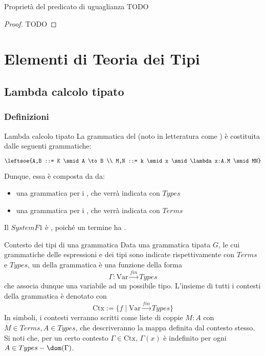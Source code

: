 \documentclass[a4paper, 12pt]{report}
\begin{document}
    \begin{framedprop}{Proprietà del predicato di uguaglianza}
        TODO
    \end{framedprop}

    \begin{proof}
        TODO
    \end{proof}

    \chapter{Elementi di Teoria dei Tipi}

    \section{Lambda calcolo tipato}

    \subsection{Definizioni}

    \begin{frameddefn}{Lambda calcolo tipato}
        La grammatica del  (noto in letteratura come ) è costituita dalle seguenti grammatiche:

        $$\leftsoe{A,B ::= K \smid A \to B \\ M,N ::= k \smid x \smid \lambda x:A.M \smid MN}$$

        Dunque, essa è composta da da:

        \begin{itemize}
            \item una grammatica per i , che verrà indicata con $Types$
            \item una grammatica per i , che verrà indicata con $Terms$
        \end{itemize}

        Il $System F1$ è , poiché un termine ha .
    \end{frameddefn}

    \begin{frameddefn}{Contesto dei tipi di una grammatica}
        Data una grammatica tipata $G$, le cui grammatiche delle espressioni e dei tipi sono indicate rispettivamente con $Terms$ e $Types$, un  della grammatica  è una funzione della forma $$\Gamma : \mathrm{Var} \stackrel{fin}{\to} Types$$ che associa dunque una variabile ad un possibile tipo. L'insieme di tutti i contesti della grammatica è denotato con $$\mathrm{Ctx} := \{f \mid \mathrm{Var} \stackrel{fin}{\to} Types\}$$ In simboli, i contesti verranno scritti come liste di coppie $M:A$ con $M \in Terms, A \in Types$, che descriveranno la mappa definita dal contesto stesso. Si noti che, per un certo contesto $\Gamma \in \mathrm{Ctx}$, $\Gamma(x)$ è indefinito per ogni $A \in Types - \dom(\Gamma)$.
    \end{frameddefn}
\end{document}
